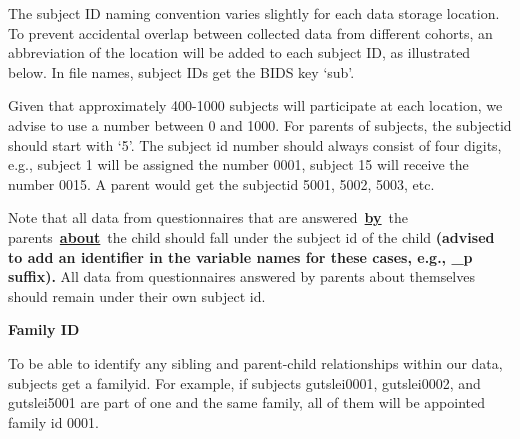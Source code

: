 \documentclass[
  letterpaper,
  DIV=11,
  numbers=noendperiod]{scrreprt}
\begin{document}
\begin{tcolorbox}[enhanced jigsaw, arc=.35mm, left=2mm, colbacktitle=quarto-callout-tip-color!10!white, bottomtitle=1mm, toptitle=1mm, titlerule=0mm, leftrule=.75mm, breakable, colframe=quarto-callout-tip-color-frame, colback=white, opacitybacktitle=0.6, coltitle=black, opacityback=0, rightrule=.15mm, toprule=.15mm, bottomrule=.15mm, title={Subject IDs}]

The subject ID naming convention varies slightly for each data storage
location. To prevent accidental overlap between collected data from
different cohorts, an abbreviation of the location will be added to each
subject ID, as illustrated below. In file names, subject IDs get the
BIDS key `sub'.

Given that approximately 400-1000 subjects will participate at each
location, we advise to use a number between 0 and 1000. For parents of
subjects, the subjectid should start with `5'. The subject id number
should always consist of four digits, e.g., subject 1 will be assigned
the number 0001, subject 15 will receive the number 0015. A parent would
get the subjectid 5001, 5002, 5003, etc.

Note that all data from questionnaires that are
answered~\ul{\textbf{by}}~the parents~\ul{\textbf{about}}~the child
should fall under the subject id of the child \textbf{(advised to add an
identifier in the variable names for these cases, e.g., \_p suffix).}
All data from questionnaires answered by parents about themselves should
remain under their own subject id.

\textbf{Family ID}

To be able to identify any sibling and parent-child relationships within
our data, subjects get a familyid. For example, if subjects gutslei0001,
gutslei0002, and gutslei5001 are part of one and the same family, all of
them will be appointed family id 0001.


\end{tcolorbox}
\end{document}
